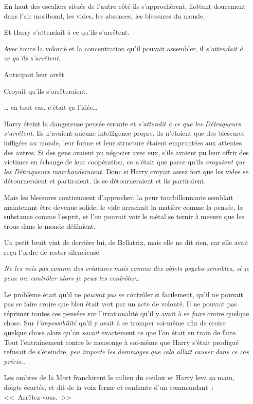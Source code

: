 En haut des escaliers situés de l'autre côté ils s'approchèrent, flottant doucement dans l'air moribond, les vides, les absences, les blessures du monde.

Et Harry s'attendait à ce qu'ils s'arrêtent.

Avec toute la volonté et la concentration qu'il pouvait assembler, il \emph{s'attendait à ce qu'ils s'arrêtent.}

Anticipait leur arrêt.

Croyait qu'ils s'arrêteraient.

… en tout cas, c'était ça l'idée…

Harry éteint la dangereuse pensée errante et \emph{s'attendit à ce que les Détraqueurs s'arrêtent.} Ils n'avaient aucune intelligence propre, ils n'étaient que des blessures infligées au monde, leur forme et leur structure étaient empruntées aux attentes des autres. Si des gens avaient pu négocier avec eux, s'ils avaient pu leur offrir des victimes en échange de leur coopération, ce n'était que parce qu'ils \emph{croyaient que les Détraqueurs marchanderaient.} Donc si Harry croyait assez fort que les vides se détourneraient et partiraient, ils se détourneraient et ils partiraient.

Mais les blessures continuaient d'approcher, la peur tourbillonnante semblait maintenant être devenue solide, le vide arrachait la matière comme la pensée, la substance comme l'esprit, et l'on pouvait voir le métal se ternir à mesure que les trous dans le monde défilaient.

Un petit bruit vint de derrière lui, de Bellatrix, mais elle ne dit rien, car elle avait reçu l'ordre de rester silencieuse.

\emph{Ne les vois pas comme des créatures mais comme des objets psycho-sensibles, si je peux me contrôler alors je peux les contrôler…}

Le problème était qu'il ne \emph{pouvait pas} se contrôler si facilement, qu'il ne pouvait pas se faire croire que bleu était vert par un acte de volonté. Il ne pouvait pas réprimer toutes ces pensées sur l'irrationalité qu'il y avait à se \emph{faire} croire quelque chose. Sur \emph{l'impossibilité} qu'il y avait à se tromper soi-même afin de croire quelque chose alors qu'on \emph{savait} exactement ce que l'on était en train de faire. Tout l'entraînement contre le mensonge à soi-même que Harry s'était prodigué refusait de s'éteindre, \emph{peu importe les dommages que cela allait causer dans ce cas précis…}

Les ombres de la Mort franchirent le milieu du couloir et Harry leva sa main, doigts écartés, et dit de la voix ferme et confiante d'un commandant~: <<~Arrêtez-vous.~>>

